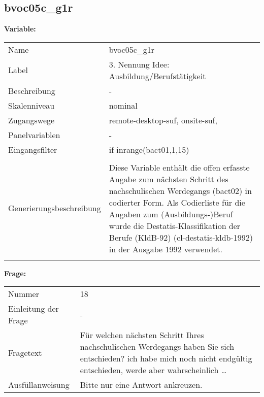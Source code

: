 	
	
	\subsection{bvoc05c\_g1r}
	\label{subSection:bvoc05c_g1r}

	\noindent\textbf{Variable:}\\
		\begin{tabular}{lL{11.3cm}}
			\label{tableVariable:bvoc05c_g1r}
			Name & bvoc05c\_g1r \\
			Label & 3. Nennung Idee: Ausbildung/Berufstätigkeit \\
			Beschreibung & - \\
			Skalenniveau & nominal \\
			Zugangswege &
				remote-desktop-suf,
				onsite-suf,
 \\
			Panelvariablen & -
			 \\
			Eingangsfilter & if inrange(bact01,1,15) \\
 \\
					Generierungsbeschreibung & Diese Variable enthält die offen erfasste Angabe zum nächsten Schritt des nachschulischen Werdegangs (bact02) in codierter Form. Als Codierliste für die Angaben zum (Ausbildungs-)Beruf wurde die Destatis-Klassifikation der Berufe (KldB-92) (cl-destatis-kldb-1992) in der Ausgabe 1992 verwendet. 
				 \\	
			 \\
		\end{tabular}

		\vspace*{1 cm}
		\noindent\textbf{Frage:}\\
		\begin{tabular}{lL{11.3cm}}
			\label{tableQuestion:bvoc05c_g1r}
			Nummer & 18 \\
			Einleitung der Frage & - \\
			Fragetext & Für welchen nächsten Schritt Ihres nachschulischen Werdegangs haben Sie sich entschieden?
ich habe mich noch nicht endgültig entschieden, werde aber wahrscheinlich … \\
			Ausfüllanweisung & Bitte nur eine Antwort ankreuzen. \\
		\end{tabular}





